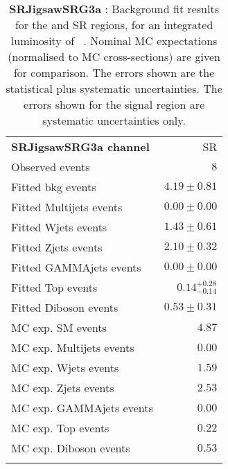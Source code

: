 

\begin{table}
\begin{center}
\setlength{\tabcolsep}{0.0pc}
{\tiny
\begin{tabular*}{\textwidth}{@{\extracolsep{\fill}}lr}
\noalign{\smallskip}\hline\noalign{\smallskip}
{\bf SRJigsawSRG3a channel}           & SR              \\[-0.05cm]
\noalign{\smallskip}\hline\noalign{\smallskip}
Observed events          & $8$                    \\
\noalign{\smallskip}\hline\noalign{\smallskip}
Fitted bkg events         & $4.19 \pm 0.81$              \\
\noalign{\smallskip}\hline\noalign{\smallskip}
        Fitted Multijets events         & $0.00 \pm 0.00$              \\
        Fitted Wjets events         & $1.43 \pm 0.61$              \\
        Fitted Zjets events         & $2.10 \pm 0.32$              \\
        Fitted GAMMAjets events         & $0.00 \pm 0.00$              \\
        Fitted Top events         & $0.14_{-0.14}^{+0.28}$              \\
        Fitted Diboson events         & $0.53 \pm 0.31$              \\
 \noalign{\smallskip}\hline\noalign{\smallskip}
MC exp. SM events              & $4.87$              \\
\noalign{\smallskip}\hline\noalign{\smallskip}
        MC exp. Multijets events         & $0.00$              \\
        MC exp. Wjets events         & $1.59$              \\
        MC exp. Zjets events         & $2.53$              \\
        MC exp. GAMMAjets events         & $0.00$              \\
        MC exp. Top events         & $0.22$              \\
        MC exp. Diboson events         & $0.53$              \\
\noalign{\smallskip}\hline\noalign{\smallskip}
\end{tabular*}
}
\end{center}
\caption{{\bf SRJigsawSRG3a} : Background fit results for the  and SR regions, for an integrated luminosity of \ourintlumi~\ifb. Nominal MC expectations (normalised to MC cross-sections) are given for comparison. The errors shown are the statistical plus systematic uncertainties. The errors shown for the signal region are systematic uncertainties only.}
\label{table.results.systematics.in.logL.fit.SR.SRJigsawSRG3a}
\end{table}
%